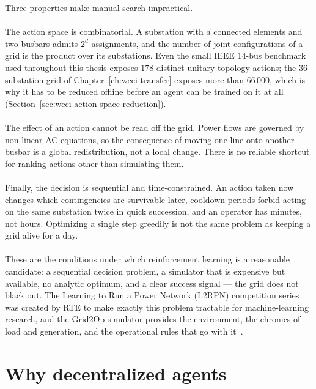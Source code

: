 Three properties make manual search impractical.
\\
\\
The action space is combinatorial. A substation with $d$ connected elements and
two busbars admits $2^{d}$ assignments, and the number of joint configurations
of a grid is the product over its substations. Even the small IEEE 14-bus
benchmark used throughout this thesis exposes $178$ distinct unitary topology
actions; the 36-substation grid of Chapter~\ref{ch:wcci-transfer} exposes more
than $66\,000$, which is why it has to be reduced offline before an agent can be
trained on it at all (Section~\ref{sec:wcci-action-space-reduction}).
\\
\\
The effect of an action cannot be read off the grid. Power flows are governed by
non-linear AC equations, so the consequence of moving one line onto another
busbar is a global redistribution, not a local change. There is no reliable
shortcut for ranking actions other than simulating them.
\\
\\
Finally, the decision is sequential and time-constrained. An action taken now
changes which contingencies are survivable later, cooldown periods forbid acting
on the same substation twice in quick succession, and an operator has minutes,
not hours. Optimizing a single step greedily is not the same problem as keeping
a grid alive for a day.
\\
\\
These are the conditions under which reinforcement learning is a reasonable
candidate: a sequential decision problem, a simulator that is expensive but
available, no analytic optimum, and a clear success signal --- the grid does not
black out. The Learning to Run a Power Network (L2RPN) competition series
was created by RTE to make exactly this problem
tractable for machine-learning research, and the Grid2Op simulator provides the
environment, the chronics of load and generation, and the operational rules that
go with it~\cite{donnot2020grid2op,marot2021l2rpn}.

\section{Why decentralized agents}
\label{sec:intro-decentralized}

